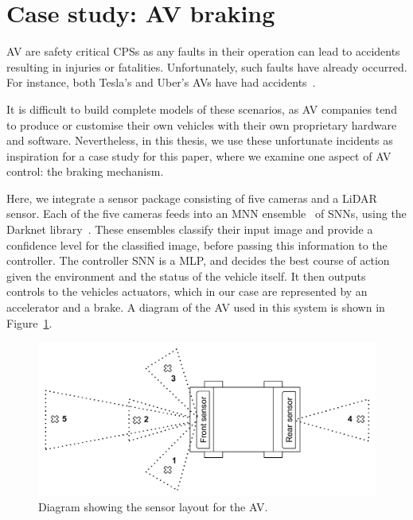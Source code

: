 \section{Case study: \acf{AV} braking}
\label{sec:case}

\ac{AV} are safety critical \acfp{CPS} as any faults in their operation can lead to accidents resulting in injuries or fatalities. 
Unfortunately, such faults have already occurred.
For instance, both Tesla's and Uber's \acp{AV} have had accidents~\cite{stewart_2018,coldewey_2018}.

It is difficult to build complete models of these scenarios, as \ac{AV} companies tend to produce or customise their own vehicles with their own proprietary hardware and software.
Nevertheless, in this thesis, we use these unfortunate incidents as inspiration for a case study for this paper, where we examine one aspect of \ac{AV} control: the braking mechanism.
 
Here, we integrate a sensor package consisting of five cameras and a \ac{LiDAR} sensor. 
Each of the five cameras feeds into an \acf{MNN} ensemble~\cite{Maqsood2004} of \acp{SNN}, using the Darknet library~\cite{darknet13}.
These ensembles classify their input image and provide a confidence level for the classified image, before passing this information to the controller.
The controller \ac{SNN} is a \ac{MLP}, and decides the best course of action given the environment and the status of the vehicle itself. 
It then outputs controls to the vehicles actuators, which in our case are represented by an accelerator and a brake.
A diagram of the \ac{AV} used in this system is shown in Figure~\ref{fig:av}. 

\begin{figure}[H]
	\centering
	\includegraphics[width=\textwidth]{Content/fig/AV.pdf}
	\caption{Diagram showing the sensor layout for the \ac{AV}. \label{fig:av}}
\end{figure}

